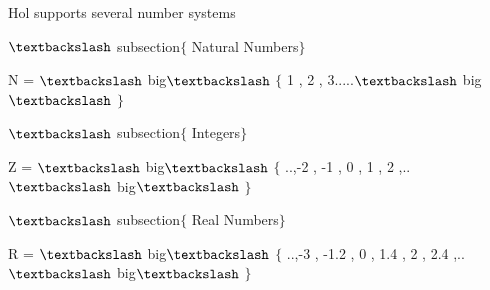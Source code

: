 \documentclass[12pt]{article}
\renewcommand{\_}{\kern-1.5pt\textunderscore\kern-1.5pt}
\begin{document}
\begin{FlushLeft}
{\fontsize{14pt}{16.8pt}\selectfont Hol supports several number systems\par}
\end{FlushLeft}\par


\vspace{\baselineskip}
\begin{FlushLeft}
{\fontsize{14pt}{16.8pt}\selectfont $\textbackslash$ subsection$ \{ $ Natural Numbers$ \} $ \par}
\end{FlushLeft}\par

\begin{FlushLeft}
{\fontsize{14pt}{16.8pt}\selectfont N = $\textbackslash$ big$\textbackslash$ $ \{ $ 1 , 2 , 3.....$\textbackslash$ big$\textbackslash$ $ \} $ \par}
\end{FlushLeft}\par


\vspace{\baselineskip}
\begin{FlushLeft}
{\fontsize{14pt}{16.8pt}\selectfont $\textbackslash$ subsection$ \{ $ Integers$ \} $ \par}
\end{FlushLeft}\par

\begin{FlushLeft}
{\fontsize{14pt}{16.8pt}\selectfont Z = $\textbackslash$ big$\textbackslash$ $ \{ $ ..,-2 , -1 , 0 , 1 , 2 ,..$\textbackslash$ big$\textbackslash$ $ \} $ \par}
\end{FlushLeft}\par


\vspace{\baselineskip}
\begin{FlushLeft}
{\fontsize{14pt}{16.8pt}\selectfont $\textbackslash$ subsection$ \{ $ Real Numbers$ \} $ \par}
\end{FlushLeft}\par

\begin{FlushLeft}
{\fontsize{14pt}{16.8pt}\selectfont R = $\textbackslash$ big$\textbackslash$ $ \{ $ ..,-3 , -1.2 , 0 , 1.4 , 2 , 2.4 ,..$\textbackslash$ big$\textbackslash$ $ \} $ \par}
\end{FlushLeft}\par
\end{document}
